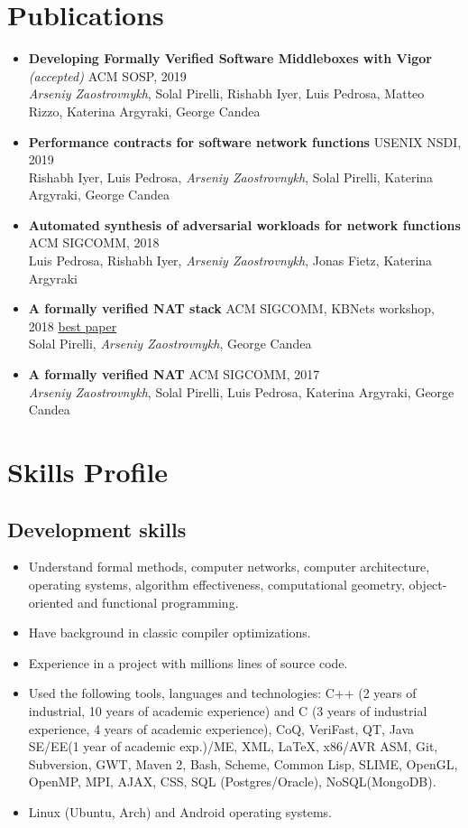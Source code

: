 \documentclass[letterpaper]{resume}
\begin{document}
\section{Publications}

\begin{itemize}
\item \textbf{Developing Formally Verified Software Middleboxes with Vigor} \emph{(accepted)} {ACM SOSP, 2019}\\
  \emph{Arseniy Zaostrovnykh}, Solal Pirelli, Rishabh Iyer, Luis Pedrosa, Matteo Rizzo, Katerina Argyraki, George Candea
\item \textbf{Performance contracts for software network functions} {USENIX NSDI, 2019} \\
  Rishabh Iyer, Luis Pedrosa, \emph{Arseniy Zaostrovnykh}, Solal Pirelli, Katerina Argyraki, George Candea
\item \textbf{Automated synthesis of adversarial workloads for network
    functions} {ACM SIGCOMM, 2018}\\
  Luis Pedrosa, Rishabh Iyer, \emph{Arseniy Zaostrovnykh}, Jonas Fietz, Katerina Argyraki
\item \textbf{A formally verified NAT stack} {ACM SIGCOMM, KBNets workshop, 2018}
  \underline{best paper} \\
  Solal Pirelli, \emph{Arseniy Zaostrovnykh}, George Candea
\item \textbf{A formally verified NAT} {ACM SIGCOMM, 2017}\\
  \emph{Arseniy Zaostrovnykh}, Solal Pirelli, Luis Pedrosa, Katerina Argyraki, George Candea

\end{itemize}

\section{Skills Profile}
\subsection{Development skills}
\begin{itemize}
    \item Understand formal methods, computer networks, computer architecture, operating systems, algorithm effectiveness, computational geometry, object-oriented and functional programming.
    \item Have background in classic compiler optimizations.
    \item Experience in a project with millions lines of source code.
    \item Used the following tools, languages and technologies: C++ (2 years of
      industrial, 10 years of academic experience) and C (3 years of industrial
      experience, 4 years of academic experience), CoQ, VeriFast, QT, Java SE/EE(1 year of academic exp.)/ME, XML, \LaTeX, x86/AVR ASM, Git, Subversion, GWT, Maven 2, Bash, Scheme, Common Lisp, SLIME, OpenGL, OpenMP, MPI, AJAX, CSS, SQL (Postgres/Oracle), NoSQL(MongoDB).
    \item Linux (Ubuntu, Arch) and Android operating systems.
\end{itemize}
\end{document}
